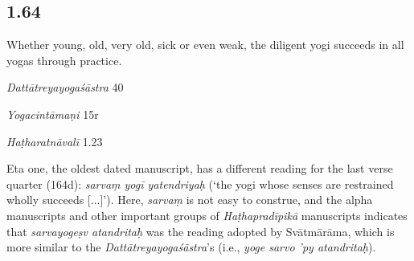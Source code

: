 \begin{ekdosis}
\subsection*{1.64}
\begin{translation}[hp01_064]
Whether young, old, very old, sick or even weak, the diligent yogi succeeds in all yogas through practice.
\end{translation}

\begin{sources}[hp01_064]
\emph{Dattātreyayogaśāstra} 40

\begin{versinnote}
\end{versinnote}

\end{sources}

\begin{testimonia}[hp01_064]
\emph{Yogacintāmaṇi} 15r

\begin{versinnote}
\end{versinnote}

\emph{Haṭharatnāvalī} 1.23

\begin{versinnote}
\end{versinnote}

\end{testimonia}

\begin{philcomm}[hp01_064]
Eta one, the oldest dated manuscript, has a different reading for the last verse quarter (164d): \emph{sarvaṃ yogī yatendriyaḥ} (`the yogi whose senses are restrained wholly succeeds [...]'). Here, \emph{sarvaṃ} is not easy to construe, and the alpha manuscripts and other important groups of \emph{Haṭhapradīpikā} manuscripts indicates that \emph{sarvayogeṣv atandritaḥ} was the reading adopted by Svātmārāma, which is more similar to the \emph{Dattātreyayogaśāstra}'s (i.e., \emph{yoge sarvo 'py atandritaḥ}). 
\end{philcomm}


\end{ekdosis}
